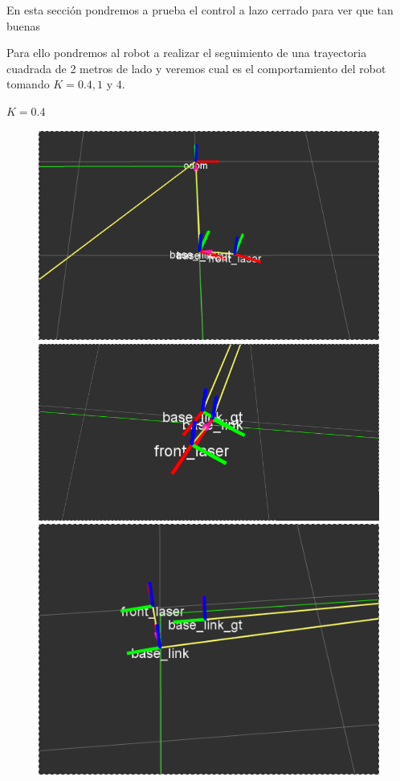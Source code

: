 En esta sección pondremos a prueba el control a lazo cerrado para ver que tan buenas \mejorar

Para ello pondremos al robot a realizar el seguimiento de una trayectoria cuadrada de 2 metros de lado y veremos cual es el comportamiento del robot tomando $K=0.4,1$ y $4$.


$K = 0.4$


\begin{figure}[!htb]
  \includegraphics[width=\linewidth]{imagenesExpLazoCerrado/k0.4/1.png}
\endminipage\hfill
{}
  \includegraphics[width=\linewidth]{imagenesExpLazoCerrado/k0.4/3.png}
\endminipage\hfill
{}%
  \includegraphics[width=\linewidth]{imagenesExpLazoCerrado/k0.4/5.png}
\endminipage
\end{figure}



